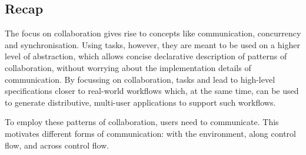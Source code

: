 \subsection{Recap}

The focus on collaboration gives rise to concepts like communication, concurrency and synchronisation.
Using tasks, however, they are meant to be used on a higher level of abstraction, which allows concise declarative description of patterns of collaboration, without worrying about the implementation details of communication.
By focussing on collaboration, tasks and \TOPHAT lead to high-level specifications closer to real-world workflows which, at the same time, can be used to generate distributive, multi-user applications to support such workflows.

To employ these patterns of collaboration, users need to communicate.
This motivates different forms of communication: with the environment, along control flow, and across control flow.
